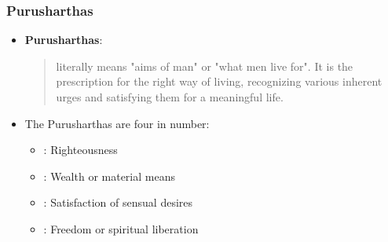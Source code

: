 \begin{frame}[fragile]\frametitle{Purusharthas}
      \begin{itemize}
        \item \textbf{Purusharthas}: 
          \begin{quote}
           literally means "aims of man" or "what men live for". It is the prescription for the right way of living, recognizing various inherent urges and satisfying them for a meaningful life.
          \end{quote}
        \item The Purusharthas are four in number: 
          \begin{itemize}
            \item \textbf{}: Righteousness
            \item \textbf{}: Wealth or material means
            \item \textbf{}: Satisfaction of sensual desires
            \item \textbf{}: Freedom or spiritual liberation
          \end{itemize}
      \end{itemize}
\end{frame}

